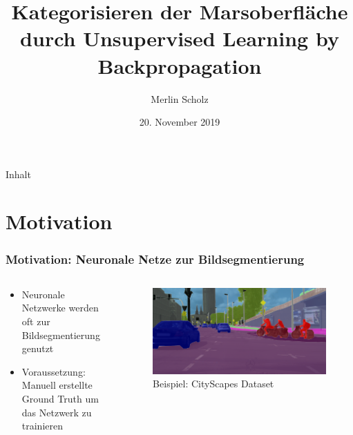 \documentclass[9pt]{beamer}
\author{Merlin Scholz}
\title[Analyse der Marsoberfläche durch Unsupervised Learning]{Kategorisieren der Marsoberfläche durch Unsupervised Learning by Backpropagation}
\date[20.11.2019]{20. November 2019}
\institute[TU Dortmund]{Mustererkennung,\\ Informatik XII, Technische Universität Dortmund}
\newenvironment{myframe}[1][]{%
	\begin{frame}%
		\frametitle{#1}
		\setcounter{footnote}{0}
		
		
	}{%
	\end{frame}%
}
\begin{document}
\begin{frame}
	
	\titlepage
	
	
	
\end{frame}

\begin{frame}{Inhalt}
	\tableofcontents
\end{frame}

\section{Motivation}

\begin{myframe}[Motivation: Neuronale Netze zur Bildsegmentierung]
\begin{columns}
	\begin{column}{.5\textwidth}
		\begin{itemize}
			\item Neuronale Netzwerke werden oft zur Bildsegmentierung genutzt
			\item Voraussetzung: Manuell erstellte Ground Truth um das Netzwerk zu trainieren
			\end{itemize}
	\end{column}
	\begin{column}{.5\textwidth}
		\begin{figure}[H]
			\includegraphics[width=\textwidth,keepaspectratio]{koeln00.png}
			\caption{Beispiel: CityScapes Dataset\cite{Cordts_2016_CVPR}}
		\end{figure}
	\end{column}
\end{columns}
\end{myframe}
\end{document}
